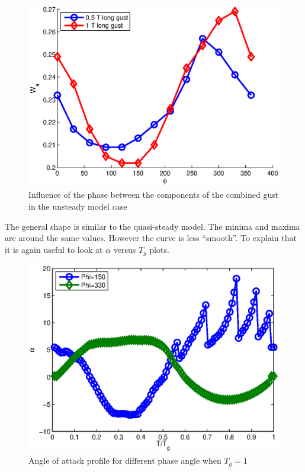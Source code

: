 \begin{figure}[h]
  \centering
  \includegraphics{./Figures/combined_gust_amplitude_vs_phase_GK.eps}
  \caption{Influence of the phase between the components of the combined gust in the unsteady model case}
  \label{fig:combined_amplitude_phase_GK}
\end{figure}

\FloatBarrier

\par The general shape is similar to the quasi-steady model.
The minima and maxima are around the same values.
However the curve is less ``smooth''.
To explain that it is again useful to look at $\alpha$ versus $T_g$ plots.

\begin{figure}[h]
  \centering
  \includegraphics{./Figures/alpha_vs_Tg_GK_phi_Tg=1.eps}
  \caption{Angle of attack profile for different phase angle when $T_g=1$}
  \label{fig:alpha_Tg_Gk_phi_tg=1}
\end{figure}

